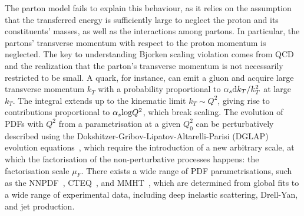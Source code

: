 The parton model fails to explain this behaviour, as it relies on the assumption that the transferred energy is sufficiently large to neglect the proton and its constituents' masses, as well as the interactions among partons. In particular, the partons' transverse momentum with respect to the proton momentum is neglected. The key to understanding Bjorken scaling violation comes from QCD and the realization that the parton's transverse momentum is not necessarily restricted to be small. A quark, for instance, can emit a gluon and acquire large transverse momentum $k_T$ with a probability proportional to $\alpha_s \mathrm{d} k_T/k_T^2$ at large $k_T$. The integral extends up to the kinematic limit $k_T\sim Q^2$, giving rise to contributions proportional to $\alpha_s\mathrm{log}Q^2$, which break scaling. The evolution of PDFs with $Q^2$ from a parametrisation at a given $Q^2_0$ can be perturbatively described using the Dokshitzer-Gribov-Lipatov-Altarelli-Parisi (DGLAP) evolution equations~\cite{Gribov:1972ri,Dokshitzer:1977sg,Altarelli:1977zs}, which require the introduction of a new arbitrary scale, at which the factorisation of the non-perturbative processes happens: the factorisation scale $\mu_F$. There exists a wide range of PDF parametrisations, such as the NNPDF~\cite{NNPDF:2021njg}, CTEQ~\cite{Dulat:2015mca}, and MMHT~\cite{Harland-Lang:2014zoa}, which are determined from global fits to a wide range of experimental data, including deep inelastic scattering, Drell-Yan, and jet production.
